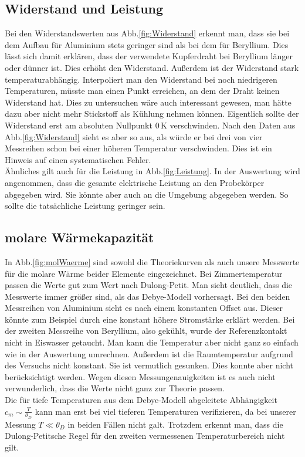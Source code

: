 \documentclass[12pt,a4paper,titlepage,headinclude,bibtotoc]{scrartcl}
\begin{document}
\subsection{Widerstand und Leistung}
Bei den Widerstandswerten aus Abb.\ref{fig:Widerstand} erkennt man, dass sie bei dem Aufbau für Aluminium stets geringer sind als bei dem für Beryllium.
Dies lässt sich damit erklären, dass der verwendete Kupferdraht bei Beryllium länger oder dünner ist.
Dies erhöht den Widerstand.
Außerdem ist der Widerstand stark temperaturabhängig.
Interpoliert man den Widerstand bei noch niedrigeren Temperaturen, müsste man einen Punkt erreichen, an dem der Draht keinen Widerstand hat.
Dies zu untersuchen wäre auch interessant gewesen, man hätte dazu aber nicht mehr Stickstoff als Kühlung nehmen können.
Eigentlich sollte der Widerstand erst am absoluten Nullpunkt $0\,$K verschwinden.
Nach den Daten aus Abb.\ref{fig:Widerstand} sieht es aber so aus, als würde er bei drei von vier Messreihen schon bei einer höheren Temperatur verschwinden.
Dies ist ein Hinweis auf einen systematischen Fehler.\\
Ähnliches gilt auch für die Leistung in Abb.\ref{fig:Leistung}.
In der Auswertung wird angenommen, dass die gesamte elektrische Leistung an den Probekörper abgegeben wird.
Sie könnte aber auch an die Umgebung abgegeben werden.
So sollte die tatsächliche Leistung geringer sein. 

\subsection{molare Wärmekapazität}
In Abb.\ref{fig:molWaerme} sind sowohl die Theoriekurven als auch unsere Messwerte für die molare Wärme beider Elemente eingezeichnet.
Bei Zimmertemperatur passen die Werte gut zum Wert nach Dulong-Petit.
Man sieht deutlich, dass die Messwerte immer größer sind, als das Debye-Modell vorhersagt.
Bei den beiden Messreihen von Aluminium sieht es nach einem konstanten Offset aus.
Dieser könnte zum Beispiel durch eine konstant höhere Stromstärke erklärt werden.
Bei der zweiten Messreihe von Beryllium, also gekühlt, wurde der Referenzkontakt nicht in Eiswasser getaucht.
Man kann die Temperatur aber nicht ganz so einfach wie in der Auswertung umrechnen.
Außerdem ist die Raumtemperatur aufgrund des Versuchs nicht konstant.
Sie ist vermutlich gesunken.
Dies konnte aber nicht berücksichtigt werden.
Wegen diesen Messungenauigkeiten ist es auch nicht verwunderlich, dass die Werte nicht ganz zur Theorie passen.\\
Die für tiefe Temperaturen aus dem Debye-Modell abgeleitete Abhängigkeit $c_m\sim \frac{T}{\theta_D}$ kann man erst bei viel tieferen Temperaturen verifizieren, da bei unserer Messung $T \ll \theta_D$ in beiden Fällen nicht galt.
Trotzdem erkennt man, dass die Dulong-Petitsche Regel für den zweiten vermessenen Temperaturbereich nicht gilt.



\end{document}
